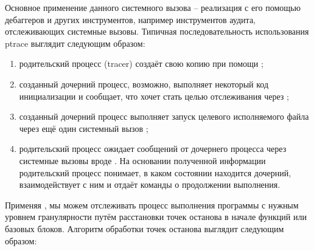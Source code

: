 Основное применение данного системного вызова -- реализация с его помощью дебаггеров и других инструментов, например инструментов аудита, отслеживающих системные вызовы. Типичная последовательность использования ptrace выглядит следующим образом:

\begin{enumerate}
	\item родительский процесс (tracer) создаёт свою копию при помощи ;
	
	\item созданный дочерний процесс, возможно, выполняет некоторый код инициализации и сообщает, что хочет стать целью отслеживания через ;
	
	\item созданный дочерний процесс выполняет запуск целевого исполняемого файла через ещё один системный вызов ;
	
	\item родительский процесс ожидает сообщений от дочернего процесса через системные вызовы вроде . На основании полученной информации родительский процесс понимает, в каком состоянии находится дочерний, взаимодействует с ним и отдаёт команды о продолжении выполнения.
\end{enumerate}

Применяя , мы можем отслеживать процесс выполнения программы с нужным уровнем гранулярности путём расстановки точек останова в начале функций или базовых блоков. Алгоритм обработки точек останова выглядит следующим образом:


